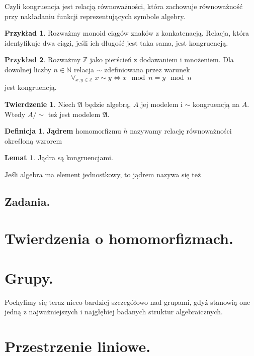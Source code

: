 \documentclass{article}
\theoremstyle{definition}
\newtheorem{definition}{Definicja}[section]
\newtheorem{example}{Przykład}[section]
\newtheorem{lemma}{Lemat}[section]
\newtheorem{theorem}{Twierdzenie}[section]
\begin{document}
Czyli kongruencja jest relacją równoważności,
	która zachowuje równoważność przy nakładaniu funkcji reprezentujących symbole algebry.

\begin{example}
	Rozważmy monoid ciągów znaków z konkatenacją.
	Relacja, która identyfikuje dwa ciągi, jeśli ich długość jest taka sama,
		jest kongruencją.
\end{example}

\begin{example}
	Rozważmy $\mathbb{Z}$ jako pierścień z dodawaniem i mnożeniem.
	Dla dowolnej liczby $n \in \mathbb{N}$ relacja $\sim$ zdefiniowana przez warunek
	\begin{equation}
		\forall_{x, y \in \mathbb{Z}} \; x \sim y \iff x \mod n = y \mod n
	\end{equation}
	jest kongruencją.
\end{example}

\begin{theorem}
	Niech $\mathfrak{A}$ będzie algebrą,
		$A$ jej modelem i $\sim$ kongruencją na $A$.
	Wtedy $A/\sim$ też jest modelem $\mathfrak{A}$.
\end{theorem}

\begin{definition}
	\textbf{Jądrem} homomorfizmu $h$ nazywamy relację równoważności określoną wzrorem
\end{definition}

\begin{lemma}
	Jądra są kongruencjami.
\end{lemma}

Jeśli algebra ma element jednostkowy, to jądrem nazywa się też

\subsection{Zadania.}

\section{Twierdzenia o homomorfizmach.}

\section{Grupy.}

Pochylimy się teraz nieco bardziej szczegółowo nad grupami,
gdyż stanowią one jedną z najważniejszych i najgłębiej badanych struktur algebraicznych.



\section{Przestrzenie liniowe.}
\end{document}
